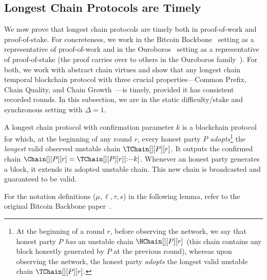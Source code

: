 \subsection{Longest Chain Protocols are Timely}

We now prove that longest chain protocols are timely both in proof-of-work and proof-of-stake.
For concreteness, we work in the Bitcoin Backbone~\cite{backbone} setting
as a representative of proof-of-work and in the Ouroboros~\cite{ouroboros} setting
as a representative of proof-of-stake (the proof carries over to others in the Ouroboros family~\cite{praos,ouroboros-genesis}).
For both, we work with abstract chain virtues
and show that any longest chain
temporal blockchain protocol with three crucial properties---Common Prefix,
Chain Quality, and Chain Growth~\cite{backbone}---is timely,
provided it has consistent recorded rounds.
In this subsection, we are in the
static difficulty/stake and synchronous setting with $\Delta = 1$.

\begin{definition}
  A longest chain protocol with confirmation parameter $k$
  is a blockchain protocol for which,
  at the beginning of any round $r$, every honest party $P$ \emph{adopts}\footnote{
    At the beginning of a round $r$, before observing the network, we say that
    honest party $P$ \emph{has} an unstable chain $\HChain[][P][r]$ (this chain
    contains any block honestly generated by $P$ at the previous round), whereas
    upon observing the network, the honest party \emph{adopts} the longest
    valid unstable chain $\TChain[][P][r]$.
  }
  the \emph{longest} valid observed unstable chain $\TChain[][P][r]$. It outputs the
  confirmed chain $\Chain[][P][r] = \TChain[][P][r][{:}{-k}]$.
  Whenever an honest party generates a block, it extends
  its adopted unstable chain. This new chain is broadcasted and
  guaranteed to be valid.
\end{definition}

For the notation definitions ($\mu, \ell, \tau, s$)
in the following lemma, refer to the original Bitcoin
Backbone paper~\cite{backbone-new}.

